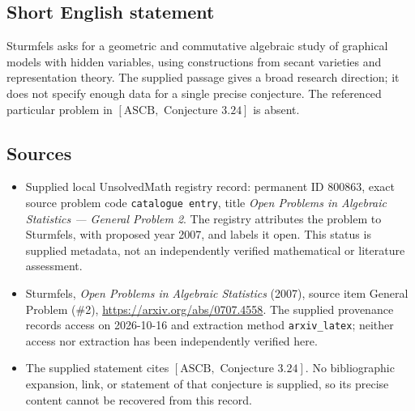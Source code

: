 \documentclass[11pt]{article}
\begin{document}
\subsection{Short English statement}
Sturmfels asks for a geometric and commutative algebraic study of graphical models with hidden variables, using constructions from secant varieties and representation theory. The supplied passage gives a broad research direction; it does not specify enough data for a single precise conjecture. The referenced particular problem in \([\mathrm{ASCB},\text{ Conjecture }3.24]\) is absent.
\subsection{Sources}
\begin{itemize}
\item Supplied local UnsolvedMath registry record: permanent ID \(800863\), exact source problem code \texttt{catalogue entry}, title \emph{Open Problems in Algebraic Statistics --- General Problem 2}. The registry attributes the problem to Sturmfels, with proposed year 2007, and labels it open. This status is supplied metadata, not an independently verified mathematical or literature assessment.
\item Sturmfels, \emph{Open Problems in Algebraic Statistics} (2007), source item General Problem (\#2), \url{https://arxiv.org/abs/0707.4558}. The supplied provenance records access on 2026-10-16 and extraction method \texttt{arxiv\_latex}; neither access nor extraction has been independently verified here.
\item The supplied statement cites \([\mathrm{ASCB},\text{ Conjecture }3.24]\). No bibliographic expansion, link, or statement of that conjecture is supplied, so its precise content cannot be recovered from this record.
\end{itemize}
\end{document}
